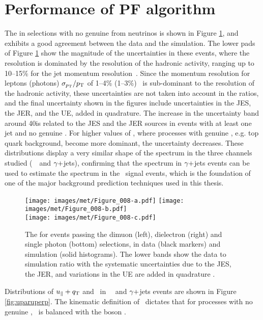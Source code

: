 \section{Performance of PF \ptmiss algorithm}
\noindent\justify
The \ptmiss in selections with no genuine \ptmiss from neutrinos is shown in Figure \ref{fig:met}, and exhibits a good agreement between the data and the simulation. 
The lower pads of Figure \ref{fig:met} show the magnitude of the uncertainties in these events, where the \ptmiss resolution is dominated by the resolution of the hadronic activity, ranging up to 10--15\% for the jet momentum resolution~\cite{Khachatryan:2016kdb}. 
Since the momentum resolution for leptons (photons) $\sigma_{p_{\mathrm{T}}}/p_{\mathrm{T}}$ of 1--4\% (1--3\%)~\cite{Khachatryan:2015iwa,Sirunyan:2018fpa} is sub-dominant to the resolution of the hadronic activity, these uncertainties are not taken into account in the ratios, and the final uncertainty shown in the figures include uncertainties in the JES, the JER, and the UE, added in quadrature. 
The increase in the uncertainty band around 40\GeV is related to the JES and the JER sources in events with at least one jet and no genuine \ptmiss. 
For higher values of \ptmiss, where processes with genuine \ptmiss, e.g. top quark background, become more dominant, the uncertainty decreases.
These distributions display a very similar shape of the \ptmiss spectrum in the three channels studied (\Zmm\, \Zee\ and $\gamma+$jets), confirming that the \ptmiss spectrum in $\gamma+$jets events can be used to estimate the \ptmiss spectrum in the \Zll\ signal events, which is the foundation of one of the major background prediction techniques used in this thesis. 
\begin{figure}[htbp!]
\centering
\texttt{[image: images/met/Figure\_008-a.pdf]}
\texttt{[image: images/met/Figure\_008-b.pdf]}\\
\texttt{[image: images/met/Figure\_008-c.pdf]}
\caption{The \ptmiss for events passing the dimuon (left), dielectron (right) and single photon (bottom) selections, in data (black markers) and simulation (solid histograms). The lower bands show the data to simulation ratio with the systematic uncertainties due to the JES, the JER, and variations in the UE are added in quadrature \cite{Sirunyan:2019kia}.}
\label{fig:met}
\end{figure}
\newpara
\noindent\justify
Distributions of $u_\Vert+{q}_{\mathrm T}$ and \uperp\ in \Zmm\, \Zee\, and $\gamma+$jets events are shown in Figure \ref{fig:uparuperp}. 
The kinematic definition of \upar\ dictates that for processes with no genuine \ptmiss, \upar\ is balanced with the boson \qt. 
